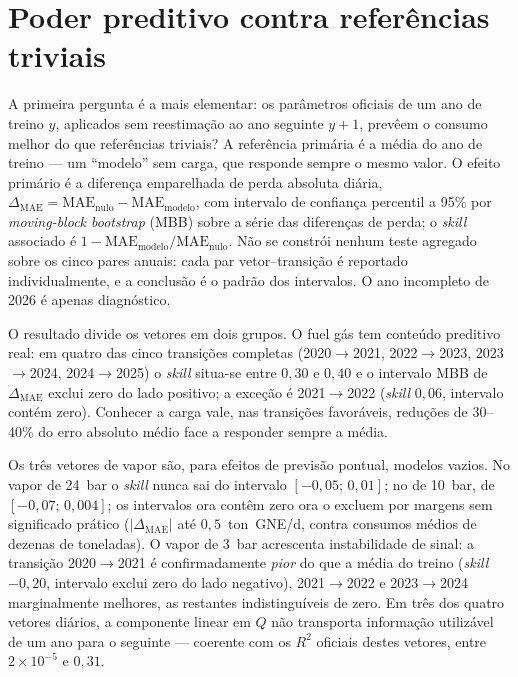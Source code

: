 \section{Poder preditivo contra referências triviais}
\label{sec:poder-preditivo}


A primeira pergunta é a mais elementar: os parâmetros oficiais
de um ano de treino $y$, aplicados sem reestimação ao ano seguinte $y{+}1$,
prevêem o consumo melhor do que referências triviais? A referência primária é
a média do ano de treino --- um ``modelo'' sem carga, que responde sempre o
mesmo valor. O efeito primário é a diferença emparelhada de perda absoluta
diária, $\Delta_{\mathrm{MAE}} = \mathrm{MAE}_{\mathrm{nulo}} -
\mathrm{MAE}_{\mathrm{modelo}}$, com intervalo de confiança percentil a 95\%
por \emph{moving-block bootstrap} (MBB) sobre a série das diferenças de
perda; o \emph{skill} associado é
$1 - \mathrm{MAE}_{\mathrm{modelo}}/\mathrm{MAE}_{\mathrm{nulo}}$. Não se
constrói nenhum teste agregado sobre os cinco pares anuais: cada par
vetor--transição é reportado individualmente, e a conclusão é o padrão dos
intervalos. O ano incompleto de 2026 é apenas diagnóstico.

O resultado divide os vetores em dois grupos. O fuel gás tem conteúdo
preditivo real: em quatro das cinco transições completas
(2020${\to}$2021, 2022${\to}$2023, 2023${\to}$2024, 2024${\to}$2025) o
\emph{skill} situa-se entre $0{,}30$ e $0{,}40$ e o intervalo MBB de
$\Delta_{\mathrm{MAE}}$ exclui zero do lado positivo; a exceção é
2021${\to}$2022 (\emph{skill} $0{,}06$, intervalo contém zero). Conhecer a
carga vale, nas transições favoráveis, reduções de 30--40\% do erro absoluto
médio face a responder sempre a média.

Os três vetores de vapor são, para efeitos de previsão pontual, modelos
vazios. No vapor de 24~bar o \emph{skill} nunca sai do intervalo
$[-0{,}05;\,0{,}01]$; no de 10~bar, de $[-0{,}07;\,0{,}004]$; os intervalos
ora contêm zero ora o excluem por margens sem significado prático
($|\Delta_{\mathrm{MAE}}|$ até $0{,}5$~ton~GNE/d, contra consumos médios de
dezenas de toneladas). O vapor de 3~bar acrescenta instabilidade de sinal: a
transição 2020${\to}$2021 é confirmadamente \emph{pior} do que a média do
treino (\emph{skill} $-0{,}20$, intervalo exclui zero do lado negativo),
2021${\to}$2022 e 2023${\to}$2024 marginalmente melhores, as restantes
indistinguíveis de zero. Em três dos quatro vetores diários, a componente
linear em $Q$ não transporta informação utilizável de um ano para o seguinte
--- coerente com os $R^2$ oficiais destes vetores, entre $2\times10^{-5}$ e
$0{,}31$.

